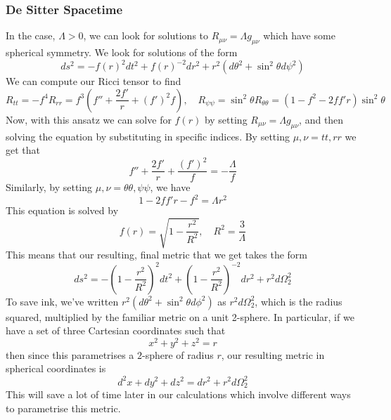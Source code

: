 \subsubsection{De Sitter Spacetime} 
In the case, $ \Lambda > 0 $, we can look for solutions 
to $ R _{ \mu \nu }  = \Lambda g_{ \mu \nu }$ which have some 
spherical symmetry. We look for solutions of the form 
\[
	d s^ 2 = - f (r ) ^ 2 d t ^ 2 + f ( r ) ^{ - 2} dr ^ 2 + r ^ 2 ( d \theta ^ 2 
	+ \sin^ 2 \theta d \psi ^ 2 ) 
\] 
We can compute our Ricci tensor 
to find 
\[
	R _{ t t }  =  - f^4 R_{ rr }  = f ^  3 \left( f '' + \frac{2 f ' }{ r } + ( f ' ) ^2 f 
		\right), \quad 
	R_{ \psi \psi }  = \sin ^ 2 \theta  R _{ \theta \theta  } = ( 1 - f ^ 2 - 2 f f ' r ) \sin ^ 2 \theta 
\] 
Now, with this ansatz we can solve 
for $ f ( r) $ by setting $ R_{ \mu \nu } = \Lambda g _{ \mu \nu } $, 
and then solving the equation by substituting in 
specific indices. 
By setting $ \mu , \nu = t t , r r $ we get that 
 \[
	 f '' + \frac{2 f ' }{ r } + \frac{ ( f ' ) ^ 2 }{ f }  = - \frac{\Lambda }{ f }
\] 
Similarly, by setting $ \mu,  \nu = \theta \theta , \psi \psi  $, we have 
\[
 1 - 2 f f ' r - f ^ 2 = \Lambda r ^ 2 
\] This equation is solved by 
\[
 f ( r)  = \sqrt{ 1 - \frac{ r ^ 2 }{ R ^ 2 }} , \quad R ^ 2 = \frac{ 3 }{ \Lambda}
\] This means that our resulting, final metric 
that we get takes the form
\[
	ds ^ 2 = -  \left( 1 - \frac{r^ 2 }{R^ 2 } \right)^2 dt ^ 2 + \left( 1 - \frac{r^2}{R^ 2 } 
	\right) ^{ -2 } dr^ 2 
	+  r ^ 2 d \Omega_2 ^ 2
\] To save ink, we've written $ r ^ 2 ( d \theta ^ 2 + \sin ^ 2 \theta d \phi ^ 2 ) $
as $ r ^ 2 d \Omega_2 ^ 2 $, which is the radius squared, multiplied by 
the familiar metric on a unit 2-sphere. In particular, if we have 
a set of three Cartesian coordinates such that 
\[
 x ^ 2 + y ^ 2 + z ^  2 = r
\] then since this parametrises a $ 2 $-sphere of radius $r$, 
our resulting metric in spherical coordinates is 
 \[
 d^ 2 x + d y ^ 2 + d z^ 2 = dr^2 + r ^ 2 d \Omega ^ 2 _ 2 
\] 
This will save a lot of time later in our calculations 
which involve different ways 
to parametrise this metric. 

